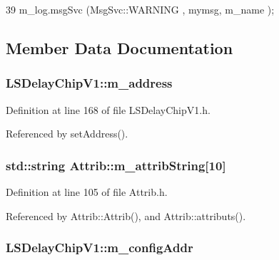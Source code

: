 \begin{DoxyCode}
39 { m_log.msgSvc (MsgSvc::WARNING , mymsg, m_name ); }
\end{DoxyCode}


\subsection{Member Data Documentation}
\hypertarget{classLSDelayChipV1_a6fba278fd2ac602c796b5e5cebf2d2de}{
\subsubsection[{m\_\-address}]{ {\bf LSDelayChipV1::m\_\-address}}}
\label{classLSDelayChipV1_a6fba278fd2ac602c796b5e5cebf2d2de}


Definition at line 168 of file LSDelayChipV1.h.

Referenced by setAddress().\hypertarget{classAttrib_a3414521d7a82476e874b25a5407b5e63}{
\subsubsection[{m\_\-attribString}]{\setlength{\rightskip}{0pt plus 5cm}std::string {\bf Attrib::m\_\-attribString}\mbox{[}10\mbox{]}}}
\label{classAttrib_a3414521d7a82476e874b25a5407b5e63}


Definition at line 105 of file Attrib.h.

Referenced by Attrib::Attrib(), and Attrib::attributs().\hypertarget{classLSDelayChipV1_ab49ac38bf9e7a41ccb89c6725cfcac3a}{
\subsubsection[{m\_\-configAddr}]{ {\bf LSDelayChipV1::m\_\-configAddr}}}
\label{classLSDelayChipV1_ab49ac38bf9e7a41ccb89c6725cfcac3a}


